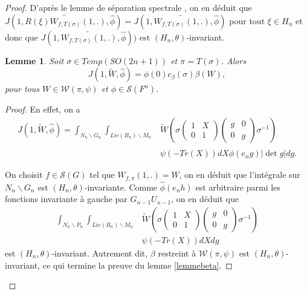 \documentclass{amsart}
\newtheorem{lemme}{Lemme}[section]
\begin{document}
\begin{proof}
D'après le lemme de séparation spectrale \cite[Lemme 5.7.2]{beuzart-plessis}, on en déduit que
$J(1, \widetilde{R(\xi)W_{f, T(\sigma)}(1,.)}, \widehat{\phi}) = J(1, \widetilde{W_{f, T(\sigma)}(1,.)}, \widehat{\phi})$ pour tout $\xi \in H_n$ et donc que $J(1, \widetilde{W_{f, T(\sigma)}(1,.)}, \widehat{\phi}))$ est $(H_n, \theta)$-invariant.

\begin{lemme}
\label{zetabeta}
Soit $\sigma \in Temp(SO(2n+1))$ et $\pi = T(\sigma)$. Alors
\begin{equation}
J(1, \widetilde{W}, \widehat{\phi}) = \phi(0)c_\beta(\sigma)\beta(W),
\end{equation}
pour tous $W \in \mathcal{W}(\pi, \psi)$ et $\phi \in \mathcal{S}(F^n)$.
\end{lemme}

\begin{proof}
En effet, on a
\begin{equation}
\begin{split}
J(1, \widetilde{W}, \widehat{\phi}) = \int_{N_n \backslash G_n} \int_{Lie(B_n) \backslash M_n} &\widetilde{W}\left(\sigma\begin{pmatrix}
1 & X \\
0 & 1
\end{pmatrix} \begin{pmatrix}
g & 0 \\
0 & g
\end{pmatrix} \sigma^{-1}\right) \\
& \psi(-Tr(X)) dX \widehat{\phi}(e_ng) |\det g| dg.
\end{split}
\end{equation}

On choisit $f \in \mathcal{S}(G)$ tel que $W_{f,\pi}(1,.) = W$, on en déduit que l'intégrale sur $N_n \backslash G_n$ est $(H_n, \theta)$-invariante. Comme $\widehat{\phi}(e_nh)$ est arbitraire parmi les fonctions invariante à gauche par $G_{n-1}U_{n-1}$, on en déduit que
\begin{equation}
\begin{split}
\int_{N_n \backslash P_n} \int_{Lie(B_n) \backslash M_n} &\widetilde{W}\left(\sigma\begin{pmatrix}
1 & X \\
0 & 1
\end{pmatrix} \begin{pmatrix}
g & 0 \\
0 & g
\end{pmatrix} \sigma^{-1}\right) \\
& \psi(-Tr(X)) dX dg
\end{split}
\end{equation}
est $(H_n, \theta)$-invariant. Autrement dit, $\beta$ restreint à $\mathcal{W}(\pi, \psi)$ est $(H_n, \theta)$-invariant, ce qui termine la preuve du lemme \ref{lemmebeta}.


\end{proof}
\end{proof}
\end{document}
